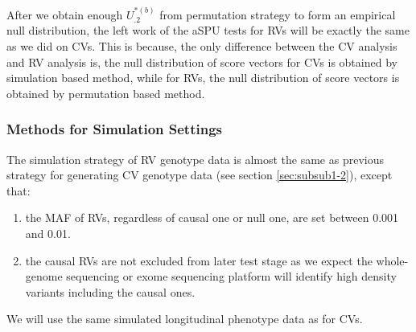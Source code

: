 \documentclass[12pt]{article}
\begin{document}
After we obtain enough $U_{.2}^{ *(b) }$ from permutation strategy to form an empirical null distribution, the left work of the aSPU tests for RVs will be exactly the same as we did on CVs. This is because, the only difference between the CV analysis and RV analysis is, the null distribution of score vectors for CVs is obtained by simulation based method, while for RVs, the null distribution of score vectors is obtained by permutation based method.

\subsubsection{Methods for Simulation Settings}\label{sec:subsub2-2}
The simulation strategy of RV genotype data is almost the same as previous strategy for generating CV genotype data (see section \ref{sec:subsub1-2}), except that:
\begin{enumerate}
\item the MAF of RVs, regardless of causal one or null one, are set between 0.001 and 0.01.
\item the causal RVs are not excluded from later test stage as we expect the whole-genome sequencing or exome sequencing platform will identify high density variants including the causal ones.
\end{enumerate}
We will use the same simulated longitudinal phenotype data as for CVs.
\end{document}
